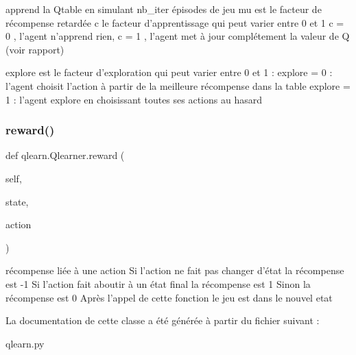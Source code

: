 \begin{DoxyVerb}apprend la Qtable en simulant nb_iter épisodes de jeu
mu est le facteur de récompense retardée
c le facteur d'apprentissage qui peut varier entre 0 et 1
c = 0 , l'agent n'apprend rien, 
c = 1 , l'agent met à jour complétement la valeur de Q (voir rapport)

explore est le facteur d'exploration qui peut varier entre 0 et 1 :
explore = 0  : l'agent choisit l'action à partir de la meilleure récompense dans la table
explore = 1 : l'agent explore en choisissant toutes ses actions au hasard
\end{DoxyVerb}
 \mbox{\label{classqlearn_1_1Qlearner_aa5d2c9fb82ed55754cab3f485551ba22}} 
\subsubsection{\texorpdfstring{reward()}{reward()}}
{\footnotesize\ttfamily def qlearn.\+Qlearner.\+reward (\begin{DoxyParamCaption}\item[{}]{self,  }\item[{}]{state,  }\item[{}]{action }\end{DoxyParamCaption})}

\begin{DoxyVerb}    récompense liée à une action
    Si l'action ne fait pas changer d'état la récompense est -1
    Si l'action fait aboutir à un état final la récompense est 1
    Sinon la récompense est 0
    Après l'appel de cette fonction le jeu est dans le nouvel etat 
\end{DoxyVerb}
 

La documentation de cette classe a été générée à partir du fichier suivant \+:\begin{DoxyCompactItemize}
\item 
qlearn.\+py\end{DoxyCompactItemize}
